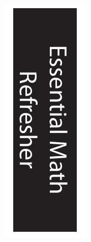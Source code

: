 \documentclass[10pt]{article}
\begin{document}
\includegraphics[max width=\textwidth]{2022_09_16_4d34b76b97ee13a67df7g-17}
\end{document}
